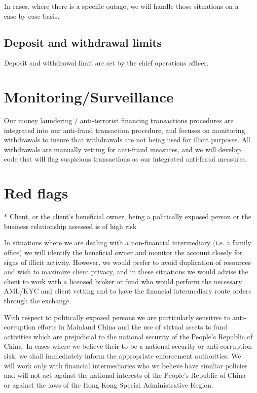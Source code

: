 In cases, where there is a specific outage, we will handle those
situations on a case by case basis.

\subsection{Deposit and withdrawal limits}
Deposit and withdrawal limit are set by the chief operations officer.

\section{Monitoring/Surveillance}

Our money laundering / anti-terrorist financing transactions
procedures are integrated into our anti-fraud transaction procedure,
and focuses on monitoring withdrawals to insure that withdrawals are
not being used for illicit purposes.  All withdrawals are manually
vetting for anti-fraud measures, and we will develop code that will
flag suspicious transactions as our integrated anti-fraud measures.


\section{Red flags}

* Client, or the client’s beneficial owner, being a politically
exposed person or the business relationship assessed is of high risk

In situations where we are dealing with a non-financial intermediary
(i.e. a family office) we will identify the beneficial owner and
monitor the account closely for signs of illicit activity.  However,
we would prefer to avoid duplication of resources and wish to maximize
client privacy, and in these situations we would advise the client to
work with a licensed broker or fund who would perform the necessary
AML/KYC and client vetting and to have the financial intermediary
route orders through the exchange.

With respect to politically exposed persons we are particularly
sensitive to anti-corruption efforts in Mainland China and the use of
virtual assets to fund activities which are prejudicial to the
national security of the People's Republic of China.  In cases where
we believe their to be a national security or anti-corruption risk, we
shall immediately inform the appropriate enforcement authorities.  We
will work only with financial intermediaries who we believe have
similiar policies and will not act against the national interests of
the People's Republic of China or against the laws of the Hong Kong
Special Administrative Region.

